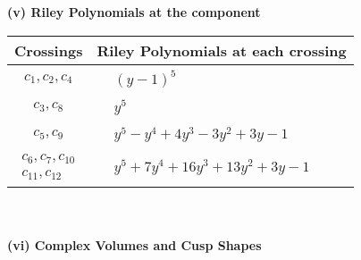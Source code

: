 \documentclass[1p]{elsarticle_modified}
\theoremstyle{definition}
\begin{document}
\newpage\renewcommand{\arraystretch}{1}
\flushleft \textbf{(v) Riley Polynomials at the component}\newline \\
\begin{tabular}{m{50pt}|m{274pt}}
Crossings & \hspace{64pt}Riley Polynomials at each crossing \\
\hline $$\begin{aligned}c_{1},c_{2},c_{4}\end{aligned}$$&$\begin{aligned}
&(y-1)^5
\end{aligned}$\\
\hline $$\begin{aligned}c_{3},c_{8}\end{aligned}$$&$\begin{aligned}
&y^5
\end{aligned}$\\
\hline $$\begin{aligned}c_{5},c_{9}\end{aligned}$$&$\begin{aligned}
&y^5- y^4+4 y^3-3 y^2+3 y-1
\end{aligned}$\\
\hline $$\begin{aligned}c_{6},c_{7},c_{10}\\c_{11},c_{12}\end{aligned}$$&$\begin{aligned}
&y^5+7 y^4+16 y^3+13 y^2+3 y-1
\end{aligned}$\\
\hline
\end{tabular}\\~\\
\newpage\flushleft \textbf{(vi) Complex Volumes and Cusp Shapes}
\end{document}
